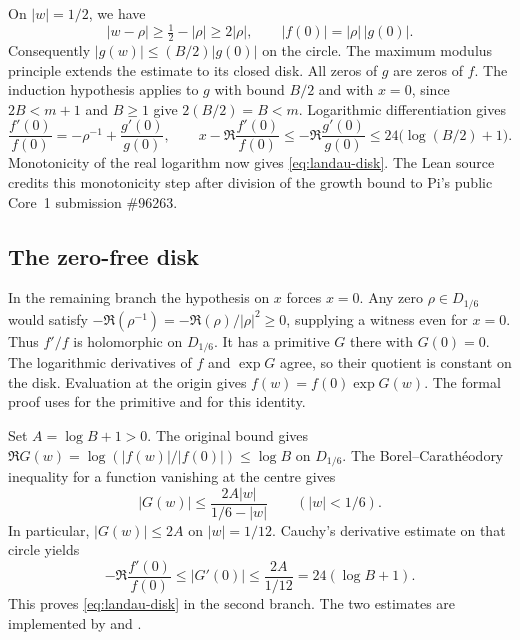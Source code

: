 On \(|w|=1/2\), we have
\[
  |w-\rho|\geq \tfrac12-|\rho|\geq 2|\rho|,\qquad
  |f(0)|=|\rho|\,|g(0)|.
\]
Consequently \(|g(w)|\leq (B/2)|g(0)|\) on the circle. The maximum
modulus principle extends the estimate to its closed disk. All zeros of
\(g\) are zeros of \(f\). The induction hypothesis applies to \(g\) with
bound \(B/2\) and with \(x=0\), since \(2B<m+1\) and \(B\geq1\) give
\(2(B/2)=B<m\). Logarithmic differentiation gives
\[
 \frac{f'(0)}{f(0)}=-\rho^{-1}+\frac{g'(0)}{g(0)},\qquad
 x-\Re\frac{f'(0)}{f(0)}
   \leq -\Re\frac{g'(0)}{g(0)}
   \leq 24\bigl(\log(B/2)+1\bigr).
\]
Monotonicity of the real logarithm now gives \eqref{eq:landau-disk}.
The Lean source credits this monotonicity step after division of the
growth bound to Pi's public Core~1 submission \#96263.

\subsection{The zero-free disk}
\label{sec:landau-regular}

In the remaining branch the hypothesis on \(x\) forces \(x=0\).
Any zero \(\rho\in D_{1/6}\) would satisfy
\(-\Re(\rho^{-1})=-\Re(\rho)/|\rho|^2\geq0\), supplying a witness even
for \(x=0\). Thus \(f'/f\) is holomorphic on \(D_{1/6}\). It has a
primitive \(G\) there with \(G(0)=0\). The logarithmic derivatives of
\(f\) and \(\exp G\) agree, so their quotient is constant on the disk.
Evaluation at the origin gives \(f(w)=f(0)\exp G(w)\). The formal proof
uses  for the primitive and 
for this identity.

Set \(A=\log B+1>0\). The original bound gives
\(\Re G(w)=\log(|f(w)|/|f(0)|)\leq\log B\) on \(D_{1/6}\).
The Borel--Carath\'eodory inequality for a function vanishing at the
centre gives
\[
  |G(w)|\leq \frac{2A|w|}{1/6-|w|}\qquad (|w|<1/6).
\]
In particular, \(|G(w)|\leq 2A\) on \(|w|=1/12\). Cauchy's derivative
estimate on that circle yields
\[
  -\Re\frac{f'(0)}{f(0)}\leq |G'(0)|
                           \leq \frac{2A}{1/12}
                           =24(\log B+1).
\]
This proves \eqref{eq:landau-disk} in the second branch. The two estimates
are implemented by  and
.
